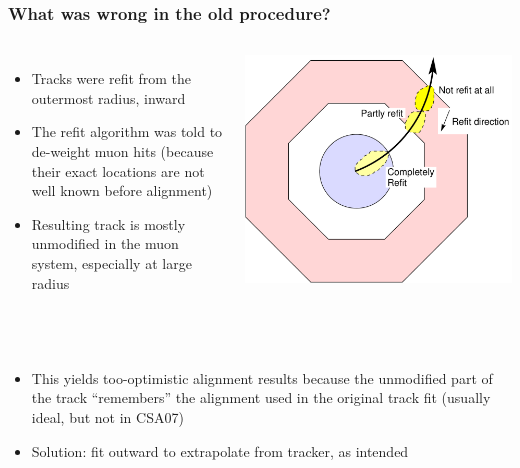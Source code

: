 \documentclass[compress]{beamer}
\begin{document}
\begin{frame}
\frametitle{What was wrong in the old procedure?}
\begin{columns}
\begin{itemize}\setlength{\itemsep}{0.2 cm}
\item Tracks were refit from the outermost radius, inward
\item The refit algorithm was told to de-weight muon hits (because
their exact locations are not well known before alignment)
\item Resulting track is mostly unmodified in the
muon system, especially at large radius
\end{itemize}
\includegraphics[width=\linewidth]{whatwaswrong.pdf}
\end{columns}

\vspace{0.3 cm}
\mbox{ }

\hspace{-0.5 cm}\begin{minipage}{\linewidth}
\begin{itemize}\setlength{\itemsep}{0.2 cm}
\item This yields too-optimistic alignment results because the
unmodified part of the track ``remembers'' the alignment used in the
original track fit (usually ideal, but not in CSA07)
\item Solution: fit outward to extrapolate from tracker, as intended
\end{itemize}
\end{minipage}
\end{frame}
\end{document}
